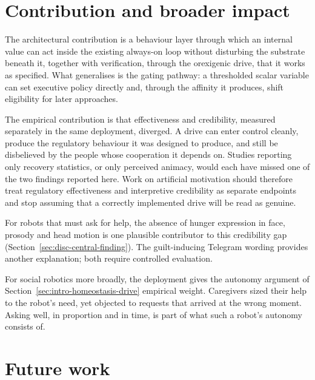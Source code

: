 \section{Contribution and broader impact}
\label{sec:concl-contribution}

The architectural contribution is a behaviour layer through which an internal value can act inside the existing always-on loop without disturbing the substrate beneath it, together with verification, through the orexigenic drive, that it works as specified. What generalises is the gating pathway: a thresholded scalar variable can set executive policy directly and, through the affinity it produces, shift eligibility for later approaches.

The empirical contribution is that effectiveness and credibility, measured separately in the same deployment, diverged. A drive can enter control cleanly, produce the regulatory behaviour it was designed to produce, and still be disbelieved by the people whose cooperation it depends on. Studies reporting only recovery statistics, or only perceived animacy, would each have missed one of the two findings reported here. Work on artificial motivation should therefore treat regulatory effectiveness and interpretive credibility as separate endpoints and stop assuming that a correctly implemented drive will be read as genuine.

For robots that must ask for help, the absence of hunger expression in face, prosody and head motion is one plausible contributor to this credibility gap (Section~\ref{sec:disc-central-finding}). The guilt-inducing Telegram wording provides another explanation; both require controlled evaluation.

For social robotics more broadly, the deployment gives the autonomy argument of Section~\ref{sec:intro-homeostasis-drive} empirical weight. Caregivers sized their help to the robot's need, yet objected to requests that arrived at the wrong moment. Asking well, in proportion and in time, is part of what such a robot's autonomy consists of.

\section{Future work}
\label{sec:concl-future-work}

